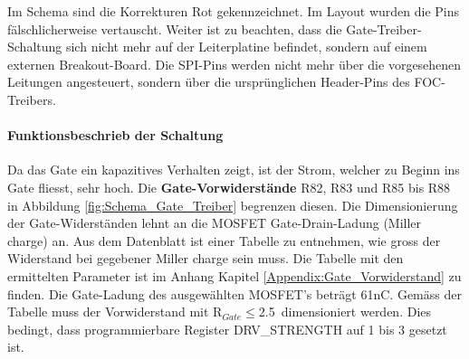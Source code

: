 Im Schema sind die Korrekturen Rot gekennzeichnet. Im Layout wurden die Pins fälschlicherweise vertauscht. Weiter ist zu beachten, dass die Gate-Treiber-Schaltung sich nicht mehr auf der Leiterplatine befindet, sondern auf einem externen Breakout-Board. Die SPI-Pins werden nicht mehr über die vorgesehenen Leitungen angesteuert, sondern über die ursprünglichen Header-Pins des FOC-Treibers.

\paragraph{Funktionsbeschrieb der Schaltung}\mbox{}

Da das Gate ein kapazitives Verhalten zeigt, ist der Strom, welcher zu Beginn ins Gate fliesst, sehr hoch. Die \textbf{Gate-Vorwiderstände} R82, R83 und R85 bis R88 in Abbildung \ref{fig:Schema_Gate_Treiber} begrenzen diesen.
Die Dimensionierung der Gate-Widerständen lehnt an die MOSFET Gate-Drain-Ladung (Miller charge) an. Aus dem Datenblatt ist einer Tabelle zu entnehmen, wie gross der Widerstand bei gegebener Miller charge sein muss. Die Tabelle mit den ermittelten Parameter ist im Anhang Kapitel \ref{Appendix:Gate_Vorwiderstand} zu finden. Die Gate-Ladung des ausgewählten MOSFET's beträgt 61nC. Gemäss der Tabelle muss der Vorwiderstand mit R$_{Gate}\leq$2.5\textOmega\ dimensioniert werden. Dies bedingt, dass programmierbare Register DRV\_STRENGTH auf 1 bis 3 gesetzt ist. \cite[S.13]{trinamicmotion_control_gmbh__co_kg_tmc6200_2019}



